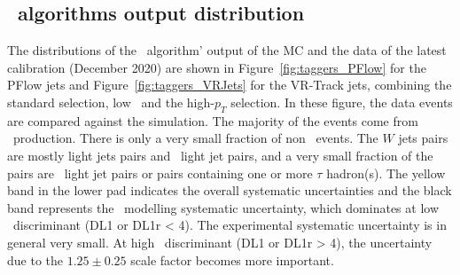 \subsection{\btagging\ algorithms output distribution}
The distributions of the \btagging\ algorithm' output of 
the MC and the data of the latest calibration 
(December 2020) are shown in Figure~\ref{fig:taggers_PFlow} for the PFlow jets and 
Figure~\ref{fig:taggers_VRJets} for the VR-Track jets, 
combining the standard selection, low \pt\ and the high-$p_T$ selection. 
In these figure, the data events are compared against the simulation.
The majority of the events come from \ttbar\ production. There is only
a very small fraction of non \ttbar\ events. The $W$ jets pairs are mostly light jets 
pairs and \cjet\ light jet pairs, and a very small fraction of the pairs are 
\bjet\ light jet pairs or pairs containing one or more $\tau$ hadron(s). 
The yellow band in the lower pad indicates the overall systematic uncertainties
and the black band represents the \ttbar\ modelling systematic uncertainty, 
which dominates at low \btagging\ discriminant (DL1 or DL1r < 4). 
The experimental systematic uncertainty is in general very small. 
At high \btagging\ discriminant (DL1 or DL1r > 4), the
uncertainty due to the $1.25 \pm 0.25$ scale factor 
becomes more important. 
